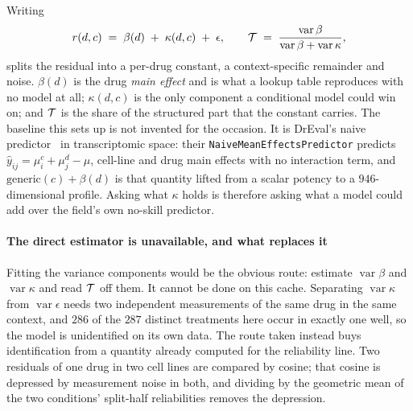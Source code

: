 Writing
\begin{equation}
 r(d,c) \;=\; \beta(d) \;+\; \kappa(d,c) \;+\; \epsilon,
 \qquad
 \mathcal{T} \;=\; \frac{\operatorname{var}\beta}{\operatorname{var}\beta + \operatorname{var}\kappa},
\end{equation}
splits the residual into a per-drug constant, a context-specific remainder and
noise. $\beta(d)$ is the drug \emph{main effect} and is what a lookup table
reproduces with no model at all; $\kappa(d,c)$ is the only component a conditional model could win
on; and $\mathcal{T}$ is the share of the structured part that the constant carries.
The baseline this sets up is not invented for the occasion. It is DrEval's naive
predictor~\cite{dreval} in transcriptomic space: their
\texttt{NaiveMeanEffectsPredictor} predicts $\hat{y}_{ij} = \mu^c_i + \mu^d_j -
\mu$, cell-line and drug main effects with no interaction term, and
$\textrm{generic}(c) + \beta(d)$ is that quantity lifted from a scalar potency to a
$946$-dimensional profile. Asking what $\kappa$ holds is therefore asking what a
model could add over the field's own no-skill predictor.

\paragraph{The direct estimator is unavailable, and what replaces it}
Fitting the variance components would be the obvious route: estimate
$\operatorname{var}\beta$ and $\operatorname{var}\kappa$ and read $\mathcal{T}$ off
them. It cannot be done on this cache. Separating $\operatorname{var}\kappa$ from
$\operatorname{var}\epsilon$ needs two independent measurements of the same drug in
the same context, and $\num{286}$ of the $\num{287}$ distinct treatments here occur
in exactly one well, so the model is unidentified on its own data. The route taken
instead buys identification from a quantity already computed for the reliability
line. Two residuals of one drug in two cell lines are compared by cosine; that
cosine is depressed by measurement noise in both, and dividing by the geometric
mean of the two conditions' split-half reliabilities removes the depression.

